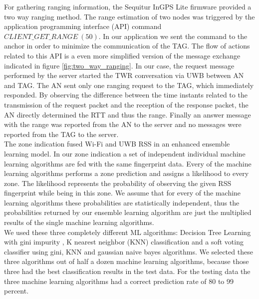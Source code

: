 \noindent\hspace*{5mm}%
For gathering ranging information, the Sequitur InGPS Lite firmware provided a two way ranging method. The range estimation of two nodes was triggered by the application programming interface (API) command $CLIENT\_GET\_RANGE\ (50)$. In our application we sent the command to the anchor in order to minimize the communication of the TAG. The flow of actions related to this API is a even more simplified version of the message exchange indicated in figure \ref{fig:two_way_ranging}. In our case, the request message performed by the server started the TWR conversation via UWB between AN and TAG. The AN sent only one ranging request to the TAG, which immediately responded. By observing the difference between the time instants related to the transmission of the request packet and the reception of the response packet, the AN directly determined the RTT and thus the range. Finally an answer message with the range was reported from the AN to the server and no messages were reported from the TAG to the server.\\
\noindent\hspace*{5mm}%
The zone indication fused Wi-Fi and UWB RSS in an enhanced ensemble learning model. In our zone indication a set of independent individual machine learning algorithms are fed with the same fingerprint data. Every of the machine learning algorithms performs a zone prediction and assigns a likelihood to every zone. The likelihood represents the probability of observing the given RSS fingerprint while being in this zone. We assume that for every of the machine learning algorithms these probabilities are statistically independent, thus the probabilities returned by our ensemble learning algorithm are just the multiplied results of the single machine learning algorithms.\\
We used these three completely different ML algorithms: Decision Tree Learning with gini impurity \cite{WikiGini}, K nearest neighbor (KNN) classification \cite{KNN} and a soft voting classifier using gini, KNN and gaussian naive bayes \cite{SKLearn, GaussianNB} algorithms. We selected these three algorithms out of half a dozen machine learning algorithms, because those three had the best classification results in the test data. For the testing data the three machine learning algorithms had a correct prediction rate of 80 to 99 percent. 


